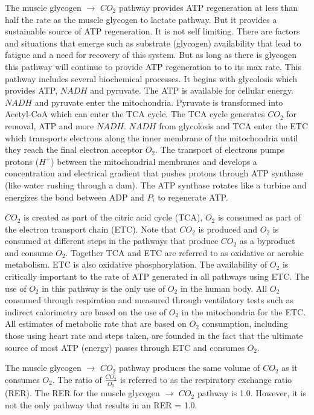 The muscle glycogen $\rightarrow$ $CO_2$ pathway provides ATP regeneration at less than half the rate as the muscle glycogen to lactate pathway. But it provides a sustainable source of ATP regeneration. It is not self limiting. There are factors and situations that emerge such as substrate (glycogen) availability that lead to fatigue and a need for recovery of this system. But as long as there is glycogen this pathway will continue to provide ATP regeneration to to its max rate. This pathway includes several biochemical processes. It begins with glycolosis which provides ATP, $NADH$ and pyruvate. The ATP is available for cellular energy. $NADH$ and pyruvate enter the mitochondria. Pyruvate is transformed into Acetyl-CoA which can enter the TCA cycle. The TCA cycle generates $CO_2$ for removal, ATP and more $NADH$. $NADH$ from glycolosis and TCA enter the ETC which transports electrons along the inner membrane of the mitochondria until they reach the final electron acceptor $O_2$. The transport of electrons pumps protons ($H^+$) between the mitochondrial membranes and develops a concentration and electrical gradient that pushes protons through ATP synthase (like water rushing through a dam). The ATP synthase rotates like a turbine and energizes the bond between ADP and $P_i$ to regenerate ATP. 

$CO_2$ is created as part of the citric acid cycle (TCA), $O_2$ is consumed as part of the electron transport chain (ETC). Note that $CO_2$ is produced and $O_2$ is consumed at different steps in the pathways that produce $CO_2$ as a byproduct and consume $O_2$. Together TCA and ETC are referred to as oxidative or aerobic metabolism. ETC is also oxidative phosphorylation. The availability of $O_2$ is critically important to the rate of ATP generated in all pathways using ETC. The use of $O_2$ in this pathway is the only use of $O_2$ in the human body. All $O_2$ consumed through respiration and measured through ventilatory tests such as indirect calorimetry are based on the use of $O_2$ in the mitochondria for the ETC. All estimates of metabolic rate that are based on $O_2$ consumption, including those using heart rate and steps taken, are founded in the fact that the ultimate source of most ATP (energy) passes through ETC and consumes $O_2$.

The muscle glycogen $\rightarrow$ $CO_2$ pathway produces the same volume of $CO_2$ as it consumes $O_2$. The ratio of $\frac{CO_2}{O_2}$ is referred to as the respiratory exchange ratio (RER). The RER for the muscle glycogen $\rightarrow$ $CO_2$ pathway is 1.0. However, it is not the only pathway that results in an RER = 1.0. 


